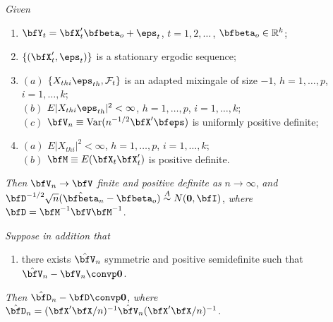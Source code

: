 \begin{theorem}\label{thm:ols-did-clt}
\textit{Given}
\begin{enumerate}
\item[$(i)$] $\bfY_t = \bfX_t'\bfbeta_o + \eps_t$, \quad $t = 1, 2, \ldots$\,, $\bfbeta_o \in \mathbb{R}^k$;
\item[$(ii)$] $\{(\bfX_t', \eps_t)\}$ is a stationary ergodic sequence;
\item[$(iii)$] $(a)$ $\{X_{thi}\eps_{th}, \mathcal{F}_t\}$ is an adapted mixingale of size $-1$, $h = 1, \ldots, p$, $i = 1, \ldots, k$;\\
$(b)$ $E|X_{thi}\eps_{th}|^2 < \infty$, $h = 1, \ldots, p$, $i = 1, \ldots, k$;\\
$(c)$ $\bfV_n \equiv \Var(n^{-1/2}\bfX'\bfeps)$ is uniformly positive definite;
\item[$(iv)$] $(a)$ $E|X_{thi}|^2 < \infty$, $h = 1, \ldots, p$, $i = 1, \ldots, k$;\\
$(b)$ $\bfM \equiv E(\bfX_t\bfX_t')$ is positive definite.
\end{enumerate}

\textit{Then} $\bfV_n \to \bfV$ \textit{finite and positive definite as} $n \to \infty$, \textit{and} $\bfD^{-1/2}\sqrt{n}(\hat{\bfbeta}_n - \bfbeta_o) \overset{A}{\sim} N(\mathbf{0}, \bfI)$, \textit{where} $\bfD = \bfM^{-1}\bfV\bfM^{-1}$.

\textit{Suppose in addition that}

\begin{enumerate}
\item[$(v)$] there exists $\hat{\bfV}_n$ symmetric and positive semidefinite such that $\hat{\bfV}_n - \bfV_n \convp \mathbf{0}$.
\end{enumerate}

\textit{Then} $\hat{\bfD}_n - \bfD \convp \mathbf{0}$, \textit{where} $\hat{\bfD}_n = (\bfX'\bfX/n)^{-1}\hat{\bfV}_n(\bfX'\bfX/n)^{-1}$.
\end{theorem}

